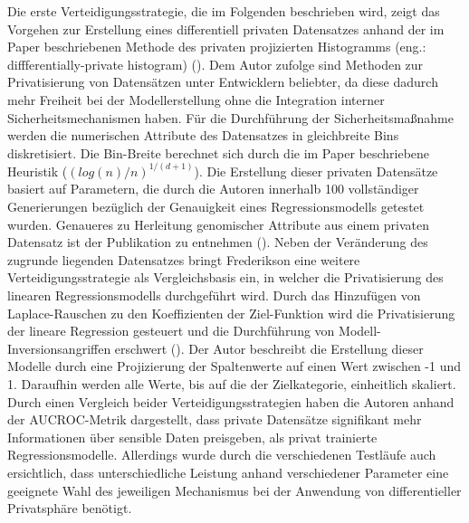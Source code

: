 Die erste Verteidigungsstrategie, die im Folgenden beschrieben wird, zeigt das Vorgehen zur Erstellung eines differentiell privaten Datensatzes anhand der im Paper beschriebenen \glqq Methode des privaten projizierten Histogramms\grqq{} (eng.: diffferentially-private histogram) (\cite[9]{fredrikson_privacy_2014}). Dem Autor zufolge sind Methoden zur Privatisierung von Datensätzen unter Entwicklern beliebter, da diese dadurch mehr Freiheit bei der Modellerstellung ohne die Integration interner Sicherheitsmechanismen haben. Für die Durchführung der Sicherheitsmaßnahme werden die numerischen Attribute des Datensatzes in gleichbreite Bins diskretisiert. Die Bin-Breite berechnet sich durch die im Paper beschriebene Heuristik ($(log(n)/n)^{1/(d+1)}$). Die Erstellung dieser privaten Datensätze basiert auf Parametern, die durch die Autoren innerhalb 100 vollständiger Generierungen bezüglich der Genauigkeit eines Regressionsmodells getestet wurden. Genaueres zu Herleitung genomischer Attribute aus einem privaten Datensatz ist der Publikation zu entnehmen (\cite[9]{fredrikson_privacy_2014}). Neben der Veränderung des zugrunde liegenden Datensatzes bringt Frederikson eine weitere Verteidigungsstrategie als Vergleichsbasis ein, in welcher die Privatisierung des linearen Regressionsmodells durchgeführt wird. Durch das Hinzufügen von Laplace-Rauschen zu den Koeffizienten der Ziel-Funktion wird die Privatisierung der lineare Regression gesteuert und die Durchführung von Modell-Inversionsangriffen erschwert (\cite[9]{fredrikson_privacy_2014}). Der Autor beschreibt die Erstellung dieser Modelle durch eine Projizierung der Spaltenwerte auf einen Wert zwischen -1 und 1. Daraufhin werden alle Werte, bis auf die der Zielkategorie, einheitlich skaliert. Durch einen Vergleich beider Verteidigungsstrategien haben die Autoren anhand der AUCROC-Metrik dargestellt, dass private Datensätze signifikant mehr Informationen über sensible Daten preisgeben, als privat trainierte Regressionsmodelle. Allerdings wurde durch die verschiedenen Testläufe auch ersichtlich, dass unterschiedliche Leistung anhand verschiedener Parameter eine geeignete Wahl des jeweiligen Mechanismus bei der Anwendung von differentieller Privatsphäre benötigt.

